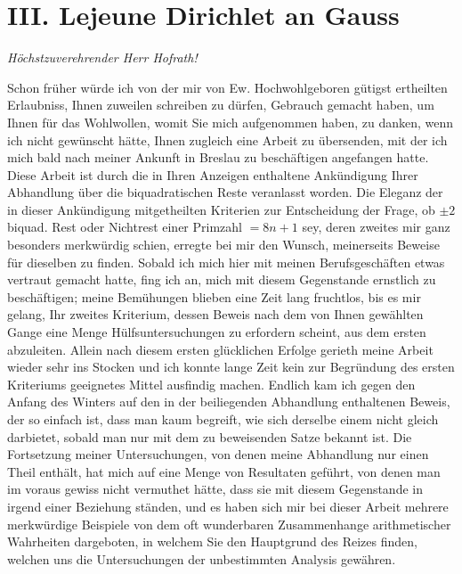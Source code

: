 \documentclass[11pt]{article}
\begin{document}
\section*{III. Lejeune Dirichlet an Gauss}
\begin{center}\emph{Höchstzuverehrender Herr Hofrath!}\end{center}

Schon früher würde ich von der mir von Ew. Hochwohlgeboren gütigst ertheilten Erlaubniss, Ihnen zuweilen schreiben zu dürfen, Gebrauch gemacht haben, um Ihnen für das Wohlwollen, womit Sie mich aufgenommen haben, zu danken, wenn ich nicht gewünscht hätte, Ihnen zugleich eine Arbeit zu übersenden, mit der ich mich bald nach meiner Ankunft in Breslau zu beschäftigen angefangen hatte. Diese Arbeit ist durch die in Ihren Anzeigen enthaltene Ankündigung Ihrer Abhandlung über die biquadratischen Reste veranlasst worden. Die Eleganz der in dieser Ankündigung mitgetheilten Kriterien zur Entscheidung der Frage, ob $\pm2$ biquad. Rest oder Nichtrest einer Primzahl $=8n+1$ sey, deren zweites mir ganz besonders merkwürdig schien, erregte bei mir den Wunsch, meinerseits Beweise für dieselben zu finden. Sobald ich mich hier mit meinen Berufsgeschäften etwas vertraut gemacht hatte, fing ich an, mich mit diesem Gegenstande ernstlich zu beschäftigen; meine Bemühungen blieben eine Zeit lang fruchtlos, bis es mir gelang, Ihr zweites Kriterium, dessen Beweis nach dem von Ihnen gewählten Gange eine Menge Hülfsuntersuchungen zu erfordern scheint, aus dem ersten abzuleiten. Allein nach diesem ersten glücklichen Erfolge gerieth meine Arbeit wieder sehr ins Stocken und ich konnte lange Zeit kein zur Begründung des ersten Kriteriums geeignetes Mittel ausfindig machen. Endlich kam ich gegen den Anfang des Winters auf den in der beiliegenden Abhandlung enthaltenen Beweis, der so einfach ist, dass man kaum begreift, wie sich derselbe einem nicht gleich darbietet, sobald man nur mit dem zu beweisenden Satze bekannt ist. Die Fortsetzung meiner Untersuchungen, von denen meine Abhandlung nur einen Theil enthält, hat mich auf eine Menge von Resultaten geführt, von denen man im voraus gewiss nicht vermuthet hätte, dass sie mit diesem Gegenstande in irgend einer Beziehung ständen, und es haben sich mir bei dieser Arbeit mehrere merkwürdige Beispiele von dem oft wunderbaren Zusammenhange arithmetischer Wahrheiten dargeboten, in welchem Sie den Hauptgrund des Reizes finden, welchen uns die Untersuchungen der unbestimmten Analysis gewähren.
\end{document}
